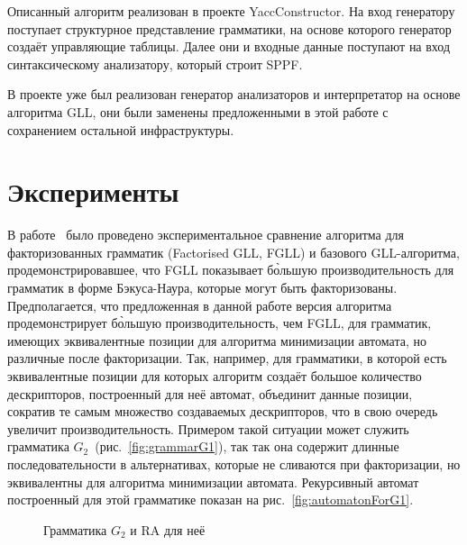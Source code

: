 \documentclass[14pt]{matmex-diploma-custom}
\begin{document}
    Описанный алгоритм реализован в проекте YaccConstructor. 
    На вход генератору поступает структурное представление грамматики, на основе которого 
    генератор создаёт управляющие таблицы. Далее они и входные данные поступают на вход
    синтаксическому анализатору, который строит SPPF. 
    
    В проекте уже был реализован генератор анализаторов и интерпретатор
    на основе алгоритма GLL, они были заменены предложенными в этой работе с сохранением остальной инфраструктуры.

	\section{Эксперименты}
    В работе~\cite{scott2016structuring}
    было проведено экспериментальное сравнение алгоритма для факторизованных грамматик (Factorised GLL, FGLL) и базового GLL-алгоритма,
    продемонстрировавшее, что FGLL показывает б\`ольшую производительность для грамматик в форме Бэкуса-Наура, которые могут быть факторизованы.
    Предполагается, что предложенная в данной работе версия алгоритма
    продемонстрирует б\`ольшую производительность, чем FGLL, для грамматик, имеющих эквивалентные позиции для алгоритма минимизации автомата, но различные после факторизации. Так, например, для грамматики, в которой есть эквивалентные позиции для которых алгоритм создаёт большое количество дескрипторов,
    построенный для неё автомат, объединит данные позиции, сократив те самым множество создаваемых дескрипторов,
    что в свою очередь увеличит производительность. Примером такой ситуации может служить грамматика 
    $G_2$~(рис.~\ref{fig:grammarG1}), так так она содержит длинные последовательности 
    в альтернативах, которые не сливаются при факторизации, но эквивалентны для алгоритма минимизации автомата.
    Рекурсивный автомат построенный для этой грамматике показан на рис.~\ref{fig:automatonForG1}.
    
    \begin{figure}[ht]   
        \centering
        
        \caption{Грамматика $G_2$ и RA для неё}
    \end{figure}
    
\end{document}
